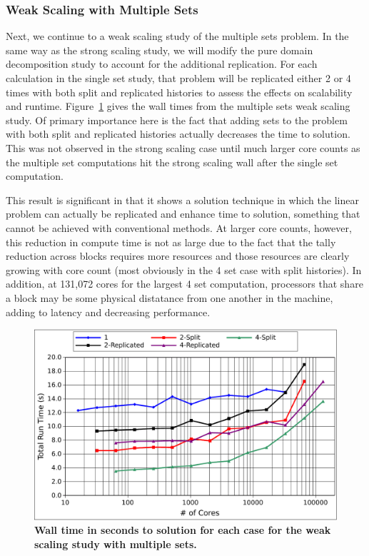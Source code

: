 \subsubsection{Weak Scaling with Multiple Sets}
\label{subsubsec:ms_weak}

Next, we continue to a weak scaling study of the multiple sets
problem. In the same way as the strong scaling study, we will modify
the pure domain decomposition study to account for the additional
replication. For each calculation in the single set study, that
problem will be replicated either 2 or 4 times with both split and
replicated histories to assess the effects on scalability and
runtime. Figure~\ref{fig:titan_weak_ms_time} gives the wall times from
the multiple sets weak scaling study. Of primary importance here is
the fact that adding sets to the problem with both split and
replicated histories actually decreases the time to solution. This was
not observed in the strong scaling case until much larger core counts
as the multiple set computations hit the strong scaling wall after the
single set computation.

This result is significant in that it shows a solution technique in
which the linear problem can actually be replicated and enhance time
to solution, something that cannot be achieved with conventional
methods. At larger core counts, however, this reduction in compute
time is not as large due to the fact that the tally reduction across
blocks requires more resources and those resources are clearly growing
with core count (most obviously in the 4 set case with split
histories). In addition, at 131,072 cores for the largest 4 set
computation, processors that share a block may be some physical
distatance from one another in the machine, adding to latency and
decreasing performance.

\begin{figure}[t!]
  \begin{center}
    \includegraphics[width=6in]{chapters/parallel_mc/titan_weak_ms_time.pdf}
  \end{center}
  \caption{\textbf{Wall time in seconds to solution for each case for
      the weak scaling study with multiple sets.}}
  \label{fig:titan_weak_ms_time}
\end{figure}

